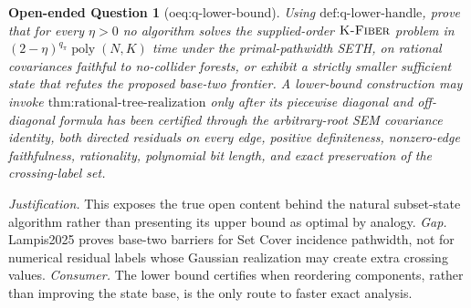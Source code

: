 \documentclass{article}
\newtheorem{openendedquestion}{Open-ended Question}
\begin{document}
\begin{openendedquestion}[oeq:q-lower-bound]\label{oeq:q-lower-bound}
Using \(\text{def:q-lower-handle}\), prove that for every \(\eta>0\) no algorithm solves the supplied-order \(\textsc{K-Fiber}\) problem in \((2-\eta)^{q_\pi}\operatorname{poly}(N,K)\) time under the primal-pathwidth SETH, on rational covariances faithful to no-collider forests, or exhibit a strictly smaller sufficient state that refutes the proposed base-two frontier. A lower-bound construction may invoke \(\text{thm:rational-tree-realization}\) only after its piecewise diagonal and off-diagonal formula has been certified through the arbitrary-root SEM covariance identity, both directed residuals on every edge, positive definiteness, nonzero-edge faithfulness, rationality, polynomial bit length, and exact preservation of the crossing-label set.
\end{openendedquestion}
\par\smallskip\noindent \textit{Justification.} This exposes the true open content behind the natural subset-state algorithm rather than presenting its upper bound as optimal by analogy. \textit{Gap.} Lampis2025 proves base-two barriers for Set Cover incidence pathwidth, not for numerical residual labels whose Gaussian realization may create extra crossing values. \textit{Consumer.} The lower bound certifies when reordering components, rather than improving the state base, is the only route to faster exact analysis.
\end{document}
